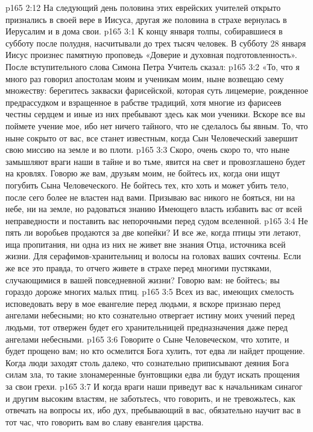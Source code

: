 \vs p165 2:12 На следующий день половина этих еврейских учителей открыто признались в своей вере в Иисуса, другая же половина в страхе вернулась в Иерусалим и в дома свои.
\vs p165 3:1 К концу января толпы, собиравшиеся в субботу после полудня, насчитывали до трех тысяч человек. В субботу 28 января Иисус произнес памятную проповедь «Доверие и духовная подготовленность». После вступительного слова Симона Петра Учитель сказал:
\vs p165 3:2 \pc «То, что я много раз говорил апостолам моим и ученикам моим, ныне возвещаю сему множеству: берегитесь закваски фарисейской, которая суть лицемерие, рожденное предрассудком и взращенное в рабстве традиций, хотя многие из фарисеев честны сердцем и иные из них пребывают здесь как мои ученики. Вскоре все вы поймете учение мое, ибо нет ничего тайного, что не сделалось бы явным. То, что ныне сокрыто от вас, все станет известным, когда Сын Человеческий завершит свою миссию на земле и во плоти.
\vs p165 3:3 Скоро, очень скоро то, что ныне замышляют враги наши в тайне и во тьме, явится на свет и провозглашено будет на кровлях. Говорю же вам, друзьям моим, не бойтесь их, когда они ищут погубить Сына Человеческого. Не бойтесь тех, кто хоть и может убить тело, после сего более не властен над вами. Призываю вас никого не бояться, ни на небе, ни на земле, но радоваться знанию Имеющего власть избавить вас от всей неправедности и поставить вас непорочными перед судом вселенной.
\vs p165 3:4 Не пять ли воробьев продаются за две копейки? И все же, когда птицы эти летают, ища пропитания, ни одна из них не живет вне знания Отца, источника всей жизни. Для серафимов\hyp{}хранительниц и волосы на головах ваших сочтены. Если же все это правда, то отчего живете в страхе перед многими пустяками, случающимися в вашей повседневной жизни? Говорю вам: не бойтесь; вы гораздо дороже многих малых птиц.
\vs p165 3:5 Всех из вас, имеющих смелость исповедовать веру в мое евангелие перед людьми, я вскоре признаю перед ангелами небесными; но кто сознательно отвергает истину моих учений перед людьми, тот отвержен будет его хранительницей предназначения даже перед ангелами небесными.
\vs p165 3:6 Говорите о Сыне Человеческом, что хотите, и будет прощено вам; но кто осмелится Бога хулить, тот едва ли найдет прощение. Когда люди заходят столь далеко, что сознательно приписывают деяния Бога силам зла, то такие злонамеренные бунтовщики едва ли будут искать прощения за свои грехи.
\vs p165 3:7 И когда враги наши приведут вас к начальникам синагог и другим высоким властям, не заботьтесь, что говорить, и не тревожьтесь, как отвечать на вопросы их, ибо дух, пребывающий в вас, обязательно научит вас в тот час, что говорить вам во славу евангелия царства.
